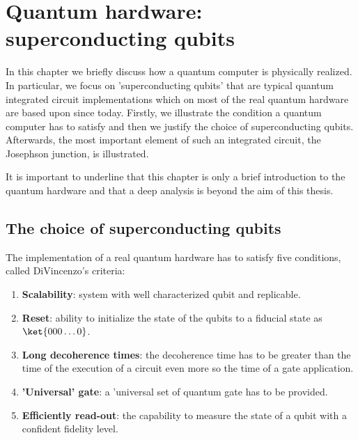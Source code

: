 \chapter{Quantum hardware: superconducting qubits}
In this chapter we briefly discuss how a quantum computer is physically realized. In particular, we focus on 'superconducting qubits' that are typical quantum integrated circuit implementations which on most of the real quantum hardware are based upon since today. Firstly, we illustrate the condition a quantum computer has to satisfy and then we justify the choice of superconducting qubits. Afterwards, the most important element of such an integrated circuit, the Josephson junction, is illustrated.

It is important to underline that this chapter is only a brief introduction to the quantum hardware and that a deep analysis is beyond the aim of this thesis. 


\section{The choice of superconducting qubits}
The implementation of a real quantum hardware has to satisfy five conditions, called DiVincenzo's criteria:

\begin{enumerate}
	\item \textbf{Scalability}: system with well characterized qubit and replicable.
	\item \textbf{Reset}: ability to initialize the state of the qubits to a fiducial state as $\ket{000\dots0}$.
	\item \textbf{Long decoherence times}: the decoherence time has to be greater than the time of the execution of a circuit even more so the time of a gate application.	
	\item \textbf{'Universal' gate}: a 'universal set of quantum gate has to be provided.
	\item \textbf{Efficiently read-out}: the capability to measure the state of a qubit with a confident fidelity level.
\end{enumerate}

